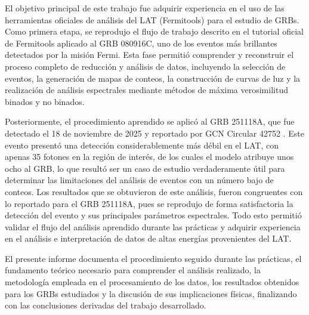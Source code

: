 \vspace{0.5cm}

El objetivo principal de este trabajo fue adquirir experiencia en el uso de las herramientas oficiales de análisis del LAT (Fermitools) para el estudio de GRBs. Como primera etapa, se reprodujo el flujo de trabajo descrito en el tutorial oficial de Fermitools aplicado al GRB 080916C, uno de los eventos más brillantes detectados por la misión Fermi. Esta fase permitió comprender y reconstruir el proceso completo de reducción y análisis de datos, incluyendo la selección de eventos, la generación de mapas de conteos, la construcción de curvas de luz y la realización de análisis espectrales mediante métodos de máxima verosimilitud binados y no binados. 

\vspace{0.5cm}

Posteriormente, el procedimiento aprendido se aplicó al GRB 251118A, que fue detectado el 18 de noviembre de 2025 y reportado por GCN Circular 42752 \cite{GCN42752}. Este evento presentó una detección considerablemente más débil en el LAT, con apenas 35 fotones en la región de interés, de los cuales el modelo atribuye unos ocho al GRB, lo que resultó ser un caso de estudio verdaderamente útil para determinar las limitaciones del análisis de eventos con un número bajo de conteos. Los resultados que se obtuvieron de este análisis, fueron congruentes con lo reportado para el GRB 251118A, pues se reprodujo de forma satisfactoria la detección del evento y sus principales parámetros espectrales. Todo esto permitió validar el flujo del análisis aprendido durante las prácticas y adquirir experiencia en el análisis e interpretación de datos de altas energías provenientes del LAT. 

\vspace{0.5cm}

El presente informe documenta el procedimiento seguido durante las prácticas, el fundamento teórico necesario para comprender el análisis realizado, la metodología empleada en el procesamiento de los datos, los resultados obtenidos para los GRBs estudiados y la discusión de sus implicaciones físicas, finalizando con las conclusiones derivadas del trabajo desarrollado.